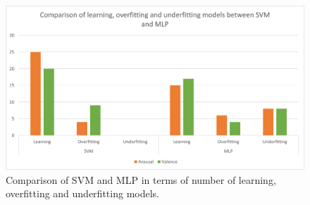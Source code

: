 \begin{figure}[h!]
\includegraphics[width=12cm]{img/results/svm_vs_mlp.png}
\centering
\caption{Comparison of SVM and MLP in terms of number of learning, overfitting and underfitting models.} \label{fig:svm_vs_mlp}
\end{figure}



